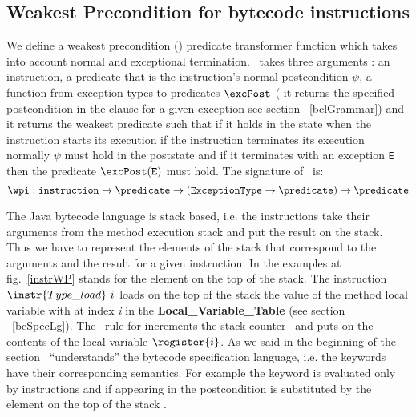 \subsection{Weakest Precondition for bytecode instructions}\label{wpInstr}
We define a weakest precondition (\wpi) predicate transformer function which takes into account normal and exceptional termination. 
\wpi \ takes three arguments : an instruction, a predicate that is the instruction's normal postcondition $\psi$, a function
from exception types to predicates $\excPost$ ( it returns the specified postcondition in the  clause for a given exception see section ~\ref{bclGrammar})  and it returns the weakest predicate such that if it holds in the state when the instruction starts its execution if the instruction terminates its execution normally  $\psi$ must hold in the poststate and if it terminates with an exception \texttt{E} then the predicate $\excPost(\tt{E})$ must hold. The signature of \wpi \ is:
$$\wpi : \texttt{instruction} \rightarrow \predicate \rightarrow (\tt{ ExceptionType} \rightarrow  \predicate) \rightarrow \predicate   $$

 The Java bytecode language is stack based, i.e. the instructions take their arguments from the method execution stack and 
 put the result on the stack. Thus we have to represent the elements of the stack that correspond to the arguments and the result for a given instruction. 
 In the examples at fig.~\ref{instrWP} \stack{\counter} stands for the element on the top of the stack. 
 The instruction $\instr{Type\_load} \ i$  loads on the top of the stack the value of the method local variable with at index \textit{i}
 in the \textbf{Local\_Variable\_Table} (see section ~\ref{bcSpecLg}). The \wpi \ rule for   increments the stack
counter \counter \ and puts on \stack{\counter} the contents of the local variable $\register{i}$.
As we said in the beginning of the section \wpi \ ``understands'' the bytecode specification language, i.e. the keywords have their 
corresponding semantics. For example the keyword  is evaluated only by  
instructions and if appearing in the postcondition   is substituted by the element on the top of 
the stack \stack{\counter}. 

